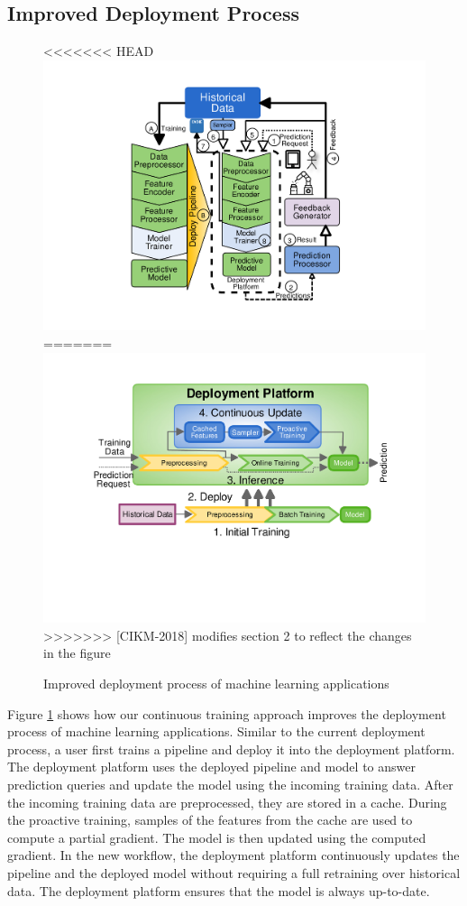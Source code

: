 \subsection{Improved Deployment Process}
\begin{figure}[t]
\centering
<<<<<<< HEAD
\includegraphics[width=\columnwidth]{../images/generic-improved-example.pdf}
=======
\includegraphics[width=\columnwidth]{../images/generic-improved-example-v2.pdf}
>>>>>>> [CIKM-2018] modifies section 2 to reflect the changes in the figure
\caption{Improved deployment process of machine learning applications}
\label{fig:improved-example}
\end{figure}

Figure \ref{fig:improved-example} shows how our continuous training approach improves the deployment process of machine learning applications.
Similar to the current deployment process, a user first trains a pipeline and deploy it into the deployment platform.
The deployment platform uses the deployed pipeline and model to answer prediction queries and update the model using the incoming training data.
After the incoming training data are preprocessed, they are stored in a cache.
During the proactive training, samples of the features from the cache are used to compute a partial gradient.
The model is then updated using the computed gradient.
In the new workflow, the deployment platform continuously updates the pipeline and the deployed model without requiring a full retraining over historical data.
The deployment platform ensures that the model is always up-to-date.